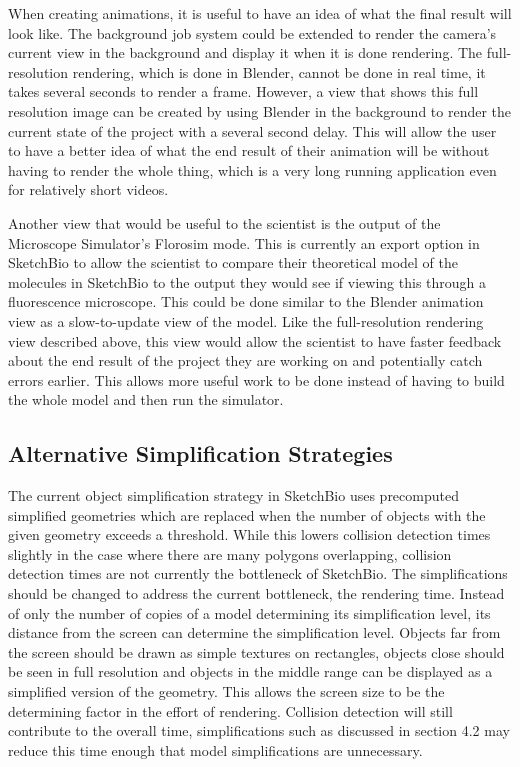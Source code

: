 \documentclass{article} %
\begin{document}
When creating animations, it is useful to have an idea of what the final result will look like.  The background job system could be extended to render the camera's current view in the background and display it when it is done rendering.  The full-resolution rendering, which is done in Blender, cannot be done in real time, it takes several seconds to render a frame.  However, a view that shows this full resolution image can be created by using Blender in the background to render the current state of the project with a several second delay.  This will allow the user to have a better idea of what the end result of their animation will be without having to render the whole thing, which is a very long running application even for relatively short videos.

Another view that would be useful to the scientist is the output of the Microscope Simulator's Florosim mode.  This is currently an export option in SketchBio to allow the scientist to compare their theoretical model of the molecules in SketchBio to the output they would see if viewing this through a fluorescence microscope.  This could be done similar to the Blender animation view as a slow-to-update view of the model.  Like the full-resolution rendering view described above, this view would allow the scientist to have faster feedback about the end result of the project they are working on and potentially catch errors earlier.  This allows more useful work to be done instead of having to build the whole model and then run the simulator.

\subsection{Alternative Simplification Strategies}
\label{sec:simplification_strategies}
The current object simplification strategy in SketchBio uses precomputed simplified geometries which are replaced when the number of objects with the given geometry exceeds a threshold.  While this lowers collision detection times slightly in the case where there are many polygons overlapping, collision detection times are not currently the bottleneck of SketchBio.  The simplifications should be changed to address the current bottleneck, the rendering time.  Instead of only the number of copies of a model determining its simplification level, its distance from the screen can determine the simplification level.  Objects far from the screen should be drawn as simple textures on rectangles, objects close should be seen in full resolution and objects in the middle range can be displayed as a simplified version of the geometry.  This allows the screen size to be the determining factor in the effort of rendering.  Collision detection will still contribute to the overall time, simplifications such as discussed in section 4.2 may reduce this time enough that model simplifications are unnecessary.
\end{document}
